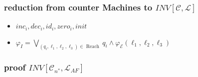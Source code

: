 \begin{frame}
    \frametitle{reduction from counter Machines to $INV[\mathcal{C},\mathcal{L}]$}
    \begin{itemize}
        \item $inc_i, dec_i, id_i, zero_i, init$
        \item $\varphi_{I}=\bigvee_{\left(q_{i}, \ell_{1}, \ell_{2}, \ell_{3}\right) \in \text { Reach }} q_{i} \wedge \varphi_{\mathcal{E}}\left(\ell_{1}, \ell_{2}, \ell_{3}\right) $
    \end{itemize}
\end{frame}
\begin{frame}
    \frametitle{proof $INV\left[\mathcal{C}_{n^{*}}, \mathcal{L}_{A F}\right]$}
\end{frame}
